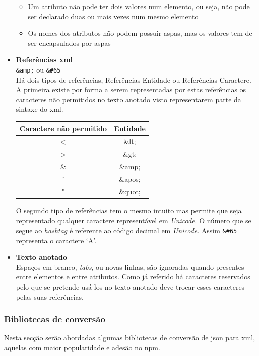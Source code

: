 \begin{itemize}
\begin{itemize}
        \item Um atributo não pode ter dois valores num elemento, ou seja, não pode ser declarado duas ou mais vezes num mesmo elemento
        \item Os nomes dos atributos não podem possuir aspas, mas os valores tem de ser encapsulados por aspas
    \end{itemize}
    \item \textbf{Referências \acrshort{xml}} \\
    \verb|&amp;| ou \verb|&#65| \\
    Há dois tipos de referências, Referências Entidade ou Referências Caractere. A primeira existe por forma a serem representadas por estas referências os caracteres não permitidos no texto anotado visto representarem parte da sintaxe do \acrshort{xml}.
    \begin{center}
        \begin{tabular}{|c|c|}
            \hline
            Caractere não permitido & Entidade \\ \hline
            < & \&lt; \\ \hline
            > & \&gt; \\ \hline
            \& & \&amp; \\ \hline
            ' & \&apos; \\ \hline
            " & \&quot; \\ \hline
        \end{tabular}
    \end{center}
    O segundo tipo de referências tem o mesmo intuito mas permite que seja representado qualquer caractere representável em \textit{Unicode}. O número que se segue ao \textit{hashtag} é referente ao código decimal em \textit{Unicode}. Assim \verb|&#65| representa o caractere `A'.
    \item \textbf{Texto anotado} \\
    Espaços em branco, \textit{tabs}, ou novas linhas, são ignoradas quando presentes entre elementos e entre atributos. Como já referido há caracteres reservados pelo que se pretende usá-los no texto anotado deve trocar esses caracteres pelas suas referências.
\end{itemize}

\subsubsection{Bibliotecas de conversão}

Nesta secção serão abordadas algumas bibliotecas de conversão de \acrshort{json} para \acrshort{xml}, aquelas com maior popularidade e adesão no \acrshort{npm}.

